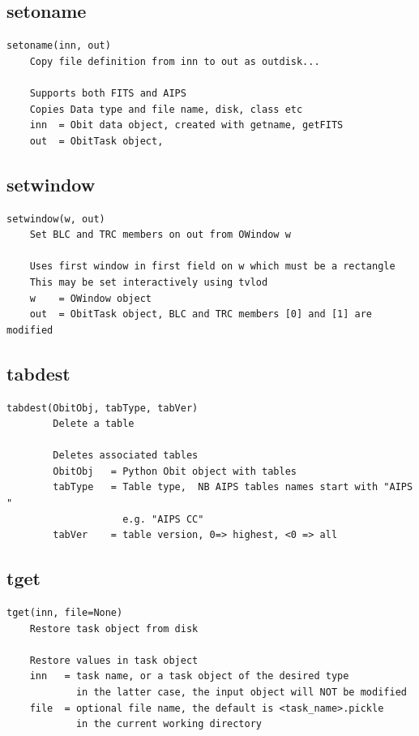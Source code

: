 \documentclass[11pt]{report}
\begin{document}
\subsection{setoname}
\begin{verbatim}
setoname(inn, out)
    Copy file definition from inn to out as outdisk...
    
    Supports both FITS and AIPS
    Copies Data type and file name, disk, class etc
    inn  = Obit data object, created with getname, getFITS
    out  = ObitTask object,
\end{verbatim}

\subsection{setwindow}
\begin{verbatim}
setwindow(w, out)
    Set BLC and TRC members on out from OWindow w
    
    Uses first window in first field on w which must be a rectangle
    This may be set interactively using tvlod
    w    = OWindow object
    out  = ObitTask object, BLC and TRC members [0] and [1] are modified
\end{verbatim}

\subsection{tabdest}
\begin{verbatim}
tabdest(ObitObj, tabType, tabVer)
        Delete a table
        
        Deletes associated tables
        ObitObj   = Python Obit object with tables
        tabType   = Table type,  NB AIPS tables names start with "AIPS "
                    e.g. "AIPS CC"
        tabVer    = table version, 0=> highest, <0 => all
\end{verbatim}
    
\subsection{tget}
\begin{verbatim}
tget(inn, file=None)
    Restore task object from disk
    
    Restore values in task object
    inn   = task name, or a task object of the desired type
            in the latter case, the input object will NOT be modified
    file  = optional file name, the default is <task_name>.pickle
            in the current working directory
\end{verbatim}
\end{document}
